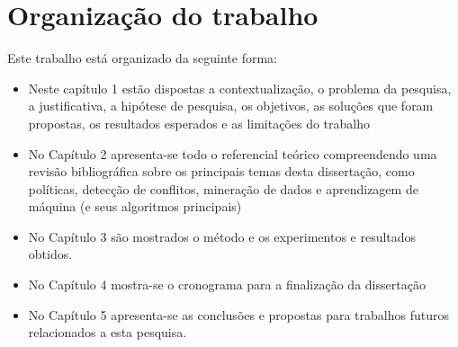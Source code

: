 \section{Organização do trabalho}
Este trabalho está organizado da seguinte forma:
\begin{itemize}
	\item Neste capítulo 1 estão dispostas a contextualização, o problema da pesquisa, a justificativa, a hipótese de pesquisa, os objetivos, as soluções que foram propostas, os resultados esperados e as limitações do trabalho
	\item No Capítulo 2 apresenta-se todo o referencial teórico compreendendo uma revisão bibliográfica sobre os principais temas desta dissertação, como políticas, detecção de conflitos, mineração de dados e aprendizagem de máquina (e seus algoritmos principais)
	\item No Capítulo 3 são mostrados o método e os experimentos e resultados obtidos.
	\item No Capítulo 4 mostra-se o cronograma para a finalização da dissertação
	\item No Capítulo 5 apresenta-se as conclusões e propostas para trabalhos futuros relacionados a esta pesquisa.
\end{itemize}